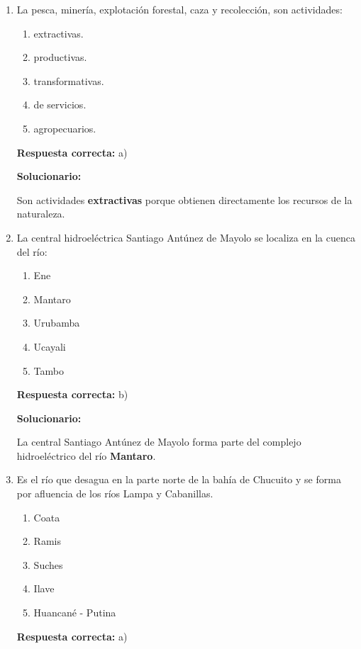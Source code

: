 \begin{enumerate}[resume]

	
	\item La pesca, minería, explotación forestal, caza y recolección, son actividades:
	\begin{enumerate}[label=\alph*)]
		\item extractivas.
		\item productivas.
		\item transformativas.
		\item de servicios.
		\item agropecuarios.
	\end{enumerate}
	\textbf{Respuesta correcta:} a)
	
	\vspace{2mm}
	\textbf{Solucionario:}
	
	Son actividades \textbf{extractivas} porque obtienen directamente los recursos de la naturaleza.
	

	
	\vspace{6mm}
	
	\item La central hidroeléctrica Santiago Antúnez de Mayolo se localiza en la cuenca del río:
	\begin{enumerate}[label=\alph*)]
		\item Ene
		\item Mantaro
		\item Urubamba
		\item Ucayali
		\item Tambo
	\end{enumerate}
	\textbf{Respuesta correcta:} b)
	
	\vspace{2mm}
	\textbf{Solucionario:}
	
	La central Santiago Antúnez de Mayolo forma parte del complejo hidroeléctrico del río \textbf{Mantaro}.
	
	
	\vspace{6mm}
	
	\item Es el río que desagua en la parte norte de la bahía de Chucuito y se forma por afluencia de los ríos Lampa y Cabanillas.
	\begin{enumerate}[label=\alph*)]
		\item Coata
		\item Ramis
		\item Suches
		\item Ilave
		\item Huancané - Putina
	\end{enumerate}
	\textbf{Respuesta correcta:} a)
	

\end{enumerate}
